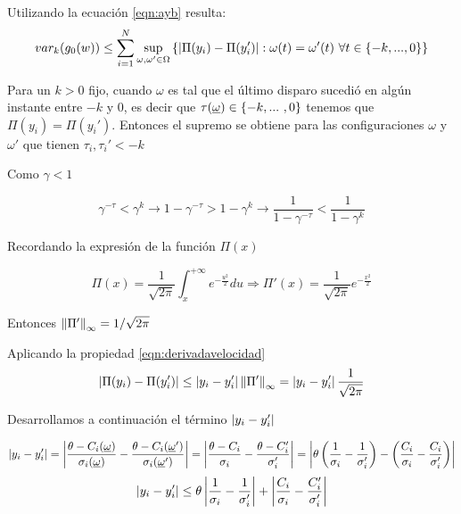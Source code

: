 Utilizando la ecuación \eqref{eqn:ayb} resulta:
\begin{equation}
    var_k(g_0(w)) \leq \sum_{i=1}^N \sup_{\omega,\omega' \in \Omega} \left\{ \left|\Pi(y_i)-\Pi(y_i')\right| : \omega(t)=\omega'(t) \ \forall t \in \{-k, ... ,0\}\right\}
    \label{eqn:varg0}
\end{equation}

Para un $k>0$ fijo, cuando $\omega$ es tal que el último disparo sucedió en algún instante entre $-k$ y $0$, es decir que $\tau(\underline{\omega}) \in \{-k, ... \ , 0 \}$ tenemos que $\Pi(y_i) = \Pi(y_i')$. Entonces el supremo se obtiene para las configuraciones $\omega$ y $\omega'$ que tienen $\tau_i,\tau_i' < -k$

Como $\gamma < 1$

\begin{equation}
  \gamma^{-\tau}<\gamma^k \longrightarrow 1-\gamma^{-\tau}> 1-\gamma^k \longrightarrow \frac{1}{1-\gamma^{-\tau}} < \frac{1}{1-\gamma^k}
  \label{eqn:desigualdadgamma}
\end{equation}

Recordando la expresión de la función $\Pi(x)$

\begin{equation}
    \Pi(x)=\frac{1}{\sqrt{2\pi}} \int_x^{+\infty} e^{-\frac{u^2}{2}} du \Longrightarrow \Pi'(x)=\frac{1}{\sqrt{2\pi}} e^{-\frac{x^2}{2}}
\end{equation}

Entonces $\left\lVert\Pi'\right\rVert_{\infty} = 1/\sqrt{2 \pi}$

Aplicando la propiedad \eqref{eqn:derivadavelocidad}
\begin{equation}
    \left|\Pi(y_i) - \Pi(y_i')\right| \leq \left|y_i - y_i'\right| \left\lVert\Pi'\right\rVert_{\infty} = \left|y_i - y_i'\right| \frac{1}{\sqrt{2 \pi}}
    \label{eqn:derivada}
\end{equation}

Desarrollamos a continuación el término $\left|y_i - y_i'\right|$

\begin{equation*}
    \left|y_i - y_i'\right| = \left|\frac{\theta - C_i(\underline{\omega})}{\sigma_i(\underline{\omega})} - 
    \frac{\theta - C_i(\underline{\omega}')}{\sigma_i(\underline{\omega}')}\right|
    = \left|\frac{\theta - C_i}{\sigma_i} - \frac{\theta - C_i'}{\sigma_i'}\right|
    = \left|\theta\left( \frac{1}{\sigma_i} - \frac{1}{\sigma_i'} \right)  - \left( \frac{C_i}{\sigma_i} - \frac{C_i}{\sigma_i'} \right) \right|
\end{equation*}
\begin{equation}
    \left|y_i - y_i'\right| \leq \theta \left|\frac{1}{\sigma_i} - \frac{1}{\sigma_i'}\right| + 
    \left|\frac{C_i}{\sigma_i} - \frac{C_i'}{\sigma_i'}\right|
    \label{eqn:diffys}
\end{equation}

